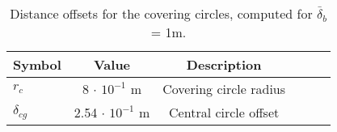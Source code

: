 \begin{table}[htbp]\label{circule_offsets}
    \small
	\begin{center}
        \begin{tabular}{lccccl}\toprule
		    \textbf{Symbol} & \textbf{Value} & \textbf{Description}\\
            \midrule
            $r_{c}$ & 8 $\cdot$ $10^{-1}$ m & Covering circle radius \\
            $\delta_{cg} $ & 2.54 $\cdot$ $10^{-1}$ m & Central circle offset \\
		    \bottomrule
		\end{tabular}
	\end{center}
    \caption{Distance offsets for the covering circles, computed for $\bar{\delta}_{b}$ = 1m. }
\end{table}

\newpage
